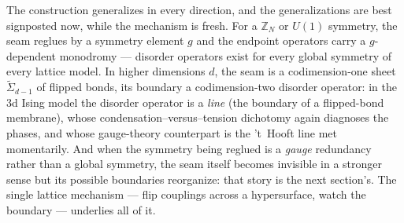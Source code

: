 The construction generalizes in every direction, and the
generalizations are best signposted now, while the mechanism is fresh.
For a $\mathbb{Z}_N$ or $U(1)$ symmetry, the seam reglues by a symmetry element
$g$ and the endpoint operators carry a $g$-dependent monodromy ---
disorder operators exist for every global symmetry of every lattice
model. In higher dimensions $d$, the seam is a codimension-one sheet
$\tilde\Sigma_{d-1}$ of flipped bonds, its boundary a codimension-two
disorder operator: in the 3d Ising model the disorder operator is a
\emph{line} (the boundary of a flipped-bond membrane), whose
condensation--versus--tension dichotomy again diagnoses the phases, and
whose gauge-theory counterpart is the 't~Hooft line met momentarily.
And when the symmetry being reglued is a \emph{gauge} redundancy rather
than a global symmetry, the seam itself becomes invisible in a stronger
sense but its possible boundaries reorganize: that story is the next
section's. The single lattice mechanism --- flip couplings across a
hypersurface, watch the boundary --- underlies all of it.

